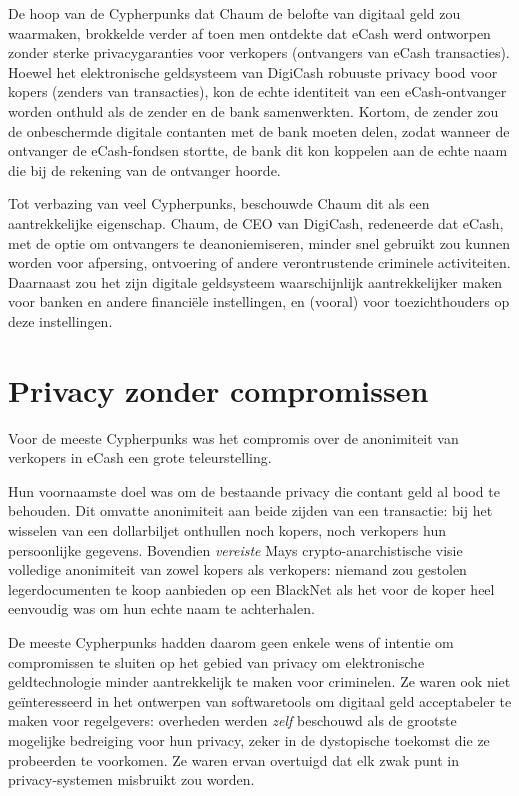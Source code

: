 \documentclass[
  a5paper,
  smalldemyvopaper,11pt,twoside,onecolumn,openright,extrafontsizes,
hidelinks]{memoir}
\begin{document}
De hoop van de Cypherpunks dat Chaum de belofte van digitaal geld zou
waarmaken, brokkelde verder af toen men ontdekte dat eCash werd
ontworpen zonder sterke privacygaranties voor verkopers (ontvangers van
eCash transacties). Hoewel het elektronische geldsysteem van DigiCash
robuuste privacy bood voor kopers (zenders van transacties), kon de
echte identiteit van een eCash-ontvanger worden onthuld als de zender en
de bank samenwerkten. Kortom, de zender zou de onbeschermde digitale
contanten met de bank moeten delen, zodat wanneer de ontvanger de
eCash-fondsen stortte, de bank dit kon koppelen aan de echte naam die
bij de rekening van de ontvanger hoorde.

Tot verbazing van veel Cypherpunks, beschouwde Chaum dit als een
aantrekkelijke eigenschap. Chaum, de CEO van DigiCash, redeneerde dat
eCash, met de optie om ontvangers te deanoniemiseren, minder snel
gebruikt zou kunnen worden voor afpersing, ontvoering of andere
verontrustende criminele activiteiten. Daarnaast zou het zijn digitale
geldsysteem waarschijnlijk aantrekkelijker maken voor banken en andere
financiële instellingen, en (vooral) voor toezichthouders op deze
instellingen.

\section{Privacy zonder compromissen}\label{privacy-zonder-compromissen}

Voor de meeste Cypherpunks was het compromis over de anonimiteit van
verkopers in eCash een grote teleurstelling.

Hun voornaamste doel was om de bestaande privacy die contant geld al
bood te behouden. Dit omvatte anonimiteit aan beide zijden van een
transactie: bij het wisselen van een dollarbiljet onthullen noch kopers,
noch verkopers hun persoonlijke gegevens. Bovendien \emph{vereiste} Mays
crypto-anarchistische visie volledige anonimiteit van zowel kopers als
verkopers: niemand zou gestolen legerdocumenten te koop aanbieden op een
BlackNet als het voor de koper heel eenvoudig was om hun echte naam te
achterhalen.

De meeste Cypherpunks hadden daarom geen enkele wens of intentie om
compromissen te sluiten op het gebied van privacy om elektronische
geldtechnologie minder aantrekkelijk te maken voor criminelen. Ze waren
ook niet geïnteresseerd in het ontwerpen van softwaretools om digitaal
geld acceptabeler te maken voor regelgevers: overheden werden
\emph{zelf} beschouwd als de grootste mogelijke bedreiging voor hun
privacy, zeker in de dystopische toekomst die ze probeerden te
voorkomen. Ze waren ervan overtuigd dat elk zwak punt in
privacy-systemen misbruikt zou worden.
\end{document}
